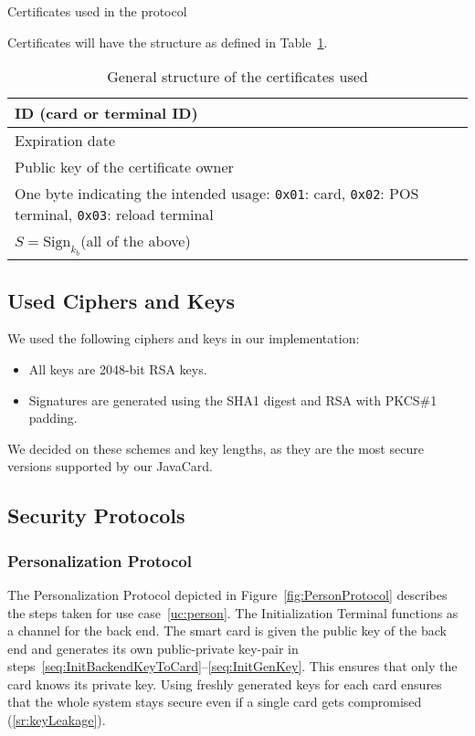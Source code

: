 \documentclass{article}
\begin{document}
\begin{table}[t]
    \centering
    
    \caption{Certificates used in the protocol}
    \label{tab:certs}
\end{table}

Certificates will have the structure as defined in Table~\ref{tab:certStructure}.
\begin{table}[ht]
    \centering
    \begin{tabular}{|p{8cm}|}
    \hline
        ID (card or terminal ID) \\
    \hline
        Expiration date \\
    \hline
        Public key of the certificate owner \\
    \hline
        One byte indicating the intended usage: \texttt{0x01}: card, \texttt{0x02}: POS terminal, \texttt{0x03}: reload terminal \\
    \hline
        $S = \textrm{Sign}_{k_b}$(all of the above) \\
    \hline
    \end{tabular}
    \caption{General structure of the certificates used}
    \label{tab:certStructure}
\end{table}

\subsection{Used Ciphers and Keys}
We used the following ciphers and keys in our implementation:
\begin{itemize}
    \item All keys are 2048-bit RSA keys.
    \item Signatures are generated using the SHA1 digest and RSA with PKCS\#1 padding.
\end{itemize}
We decided on these schemes and key lengths, as they are the most secure versions supported by our JavaCard.

\subsection{Security Protocols}
\subsubsection{Personalization Protocol} \label{sec:perProtocol}
The Personalization Protocol depicted in Figure~\ref{fig:PersonProtocol} describes the steps taken for use case~\ref{uc:person}.
The Initialization Terminal functions as a channel for the back end. 
The smart card is given the public key of the back end and generates its own public-private key-pair in steps~\ref{seq:InitBackendKeyToCard}--\ref{seq:InitGenKey}.
This ensures that only the card knows its private key.
Using freshly generated keys for each card ensures that the whole system stays secure even if a single card gets compromised (\ref{sr:keyLeakage}).
\end{document}
